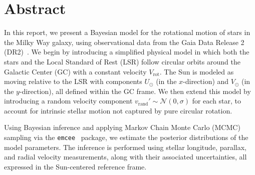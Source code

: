 \section*{Abstract}
In this report, we present a Bayesian model for the rotational motion of stars in the Milky Way galaxy, 
using observational data from the Gaia Data Release 2 (DR2)~\cite{GAIADR2}. 
We begin by introducing a simplified physical model in which both the stars and the Local Standard of Rest (LSR) 
follow circular orbits around the Galactic Center (GC) with a constant velocity $V_{\text{rot}}$. 
The Sun is modeled as moving relative to the LSR with components $U_{\odot}$ (in the $x$-direction) 
and $V_{\odot}$ (in the $y$-direction), all defined within the GC frame. 
We then extend this model by introducing a random velocity component $v_{\text{rand}}' \sim \mathcal{N}(0, \sigma)$ for each star, 
to account for intrinsic stellar motion not captured by pure circular rotation.


Using Bayesian inference and applying Markov Chain Monte Carlo (MCMC) sampling via the \texttt{emcee}~\cite{EMCEE} package, 
we estimate the posterior distributions of the model parameters. 
The inference is performed using stellar longitude, parallax, and radial velocity measurements, 
along with their associated uncertainties, all expressed in the Sun-centered reference frame.

